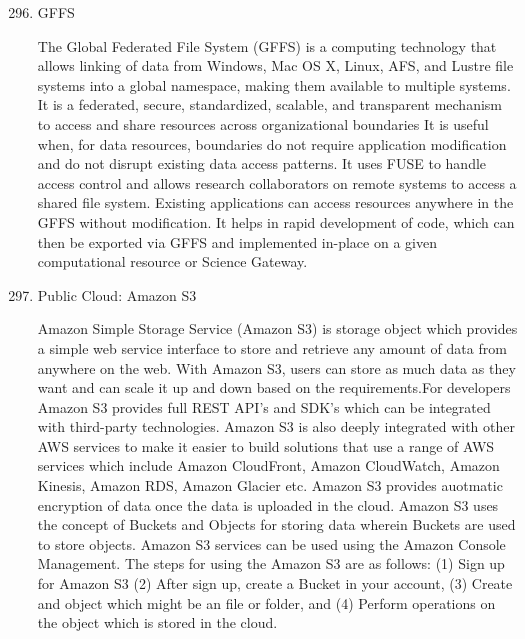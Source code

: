 \begin{enumerate}
\setcounter{enumi}{295}
\item {} 
GFFS

The Global Federated File System (GFFS) \label{\detokenize{i524/technologies:id550}}{\hyperref[\detokenize{i524/technologies:www-gffs}]{\sphinxcrossref{{[}471{]}}}} is a
computing technology that allows linking of data from Windows,
Mac OS X, Linux, AFS, and Lustre file systems into a global
namespace, making them available to multiple systems. It is a
federated, secure, standardized, scalable, and transparent
mechanism to access and share resources across organizational
boundaries It is useful when, for data resources, boundaries do
not require application modification and do not disrupt existing
data access patterns. It uses FUSE to handle access control and
allows research collaborators on remote systems to access a
shared file system. Existing applications can access resources
anywhere in the GFFS without modification. It helps in rapid
development of code, which can then be exported via GFFS and
implemented in-place on a given computational resource or Science
Gateway.

\item {} 
Public Cloud: Amazon S3

Amazon Simple Storage Service (Amazon S3) \label{\detokenize{i524/technologies:id551}}{\hyperref[\detokenize{i524/technologies:www-amazon-s3}]{\sphinxcrossref{{[}472{]}}}} is
storage object which provides a simple web service interface to
store and retrieve any amount of data from anywhere on the
web. With Amazon S3, users can store as much data as they want
and can scale it up and down based on the requirements.For
developers Amazon S3 provides full REST API's and SDK's which can
be integrated with third-party technologies. Amazon S3 is also
deeply integrated with other AWS services to make it easier to
build solutions that use a range of AWS services which include
Amazon CloudFront, Amazon CloudWatch, Amazon Kinesis, Amazon RDS,
Amazon Glacier etc. Amazon S3 provides auotmatic encryption of
data once the data is uploaded in the cloud. Amazon S3 uses the
concept of Buckets and Objects for storing data wherein Buckets
are used to store objects. Amazon S3 services can be used using
the Amazon Console Management. \label{\detokenize{i524/technologies:id552}}{\hyperref[\detokenize{i524/technologies:www-amazon-s3-docs}]{\sphinxcrossref{{[}473{]}}}} The steps
for using the Amazon S3 are as follows: (1) Sign up for Amazon S3
(2) After sign up, create a Bucket in your account, (3) Create
and object which might be an file or folder, and (4) Perform
operations on the object which is stored in the cloud.


\end{enumerate}
